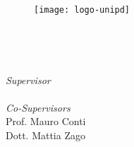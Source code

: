 
\begin{titlepage}

\begin{center}

\begin{LARGE}
\textbf{\myUni}\\
\end{LARGE}

\vspace{10pt}

\begin{Large}
\textsc{\myDepartment}\\
\end{Large}

\vspace{10pt}

\begin{large}
\textsc{\myFaculty}\\
\end{large}

\vspace{30pt}
\begin{figure}[htbp]
\begin{center}
\texttt{[image: logo-unipd]}
\end{center}
\end{figure}
\vspace{1pt} 

\begin{Large}
\begin{center}
\textbf{\myTitle}\\
\end{center}
\end{Large}

\vspace{10pt} 

\begin{large}
\textsl{\myDegree}\\
\end{large}

\vspace{20pt} 

\begin{large}
\begin{flushleft}
\textit{Supervisor}\\ 
\vspace{3pt} 
\profTitle \myProf \\
\vspace{7pt} 
\textit{Co-Supervisors}\\ 
\vspace{3pt} 
Prof. Mauro Conti\\
\vspace{2pt} 
Dott. Mattia Zago
\end{flushleft}


\end{large}
\end{center}
\end{titlepage}
